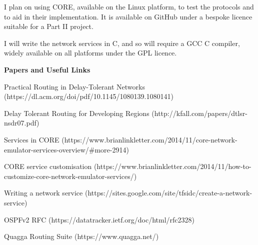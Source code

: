 \documentclass[withindex,glossary,openany]{cam-thesis}
\begin{document}
I plan on using CORE, available on the Linux platform, to test the protocols and to aid in their implementation. It is available on GitHub under a bespoke licence suitable for a Part II project.

I will write the network services in C, and so will require a GCC C compiler, widely available on all platforms under the GPL licence.

\vspace{8mm}
\LARGE\textbf{Papers and Useful Links}\normalsize

Practical Routing in Delay-Tolerant Networks (https://dl.acm.org/doi/pdf/10.1145/1080139.1080141)

Delay Tolerant Routing for Developing Regions (http://kfall.com/papers/dtlsr-nsdr07.pdf)

Services in CORE (https://www.brianlinkletter.com/2014/11/core-network-emulator-services-overview/\#more-2914)

CORE service customisation (https://www.brianlinkletter.com/2014/11/how-to-customize-core-network-emulator-services/)

Writing a network service (https://sites.google.com/site/tfsidc/create-a-network-service)

OSPFv2 RFC (https://datatracker.ietf.org/doc/html/rfc2328)

Quagga Routing Suite (https://www.quagga.net/)




\end{document}

